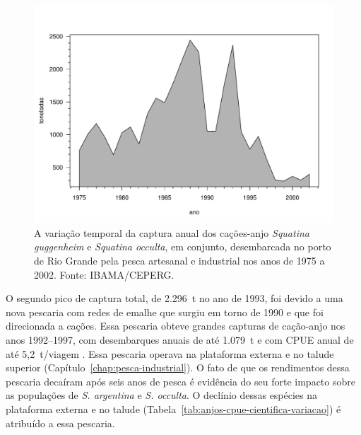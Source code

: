 \documentclass[a4paper,11pt,twoside,showtrims,onecolumn,openright,final]{memoir}
\begin{document}
%
%

\begin{figure}
\begin{center}
\includegraphics[width=\textwidth]{DESEMBARQUESTOTAISANJOS}
\end{center}
\caption[A variação temporal da captura anual dos cações-anjo \emph{Squatina guggenheim} 
	e \emph{Squatina occulta}, em conjunto, 
        desembarcada no porto de Rio Grande
	pela pesca artesanal e industrial 
	nos anos de 1975 a 2002.]
	{A variação temporal da captura anual dos cações-anjo \emph{Squatina guggenheim} 
	e \emph{Squatina occulta}, em conjunto, 
        desembarcada no porto de Rio Grande
	pela pesca artesanal e industrial 
	nos anos de 1975 a 2002. Fonte: IBAMA/CEPERG.}
\label{fig:anjos-desembarques-1975a2002}
\end{figure}


O segundo pico de captura total, de 2.296~t no ano de 1993, foi devido a uma nova pescaria 
com redes de emalhe que surgiu em torno de 1990 e que foi direcionada a cações. 
Essa pescaria obteve grandes capturas de cação-anjo nos anos 1992--1997, com desembarques 
anuais  de até 1.079~t e com CPUE anual de até 5,2~t/viagem \citep[Figura~\ref{fig:anjos-desembarques-1975a2002}]{miranda2003}. %
Essa pescaria operava na plataforma externa e no talude superior (Capítulo~\ref{chap:pesca-industrial}).
O fato de que os rendimentos dessa pescaria decaíram após seis anos de pesca é evidência do 
seu forte impacto sobre as populações de \emph{S. argentina}  e \emph{S. occulta}.
O declínio dessas espécies na plataforma externa e no talude (Tabela~\ref{tab:anjos-cpue-cientifica-variacao}) %
é atribuído a essa pescaria.
\end{document}
